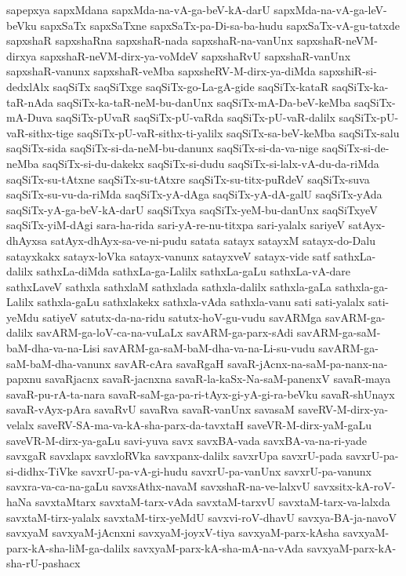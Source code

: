 {sapepxya
sapxMdana
sapxMda-na-vA-ga-beV-kA-darU
sapxMda-na-vA-ga-leV-beVku
sapxSaTx
sapxSaTxne
sapxSaTx-pa-Di-sa-ba-hudu
sapxSaTx-vA-gu-tatxde
sapxshaR
sapxshaRna
sapxshaR-nada
sapxshaR-na-vanUnx
sapxshaR-neVM-dirxya
sapxshaR-neVM-dirx-ya-voMdeV
sapxshaRvU
sapxshaR-vanUnx
sapxshaR-vanunx
sapxshaR-veMba
sapxsheRV-M-dirx-ya-diMda
sapxshiR-si-dedxlAlx
saqSiTx
saqSiTxge
saqSiTx-go-La-gA-gide
saqSiTx-kataR
saqSiTx-ka-taR-nAda
saqSiTx-ka-taR-neM-bu-danUnx
saqSiTx-mA-Da-beV-keMba
saqSiTx-mA-Duva
saqSiTx-pUvaR
saqSiTx-pU-vaRda
saqSiTx-pU-vaR-dalilx
saqSiTx-pU-vaR-sithx-tige
saqSiTx-pU-vaR-sithx-ti-yalilx
saqSiTx-sa-beV-keMba
saqSiTx-salu
saqSiTx-sida
saqSiTx-si-da-neM-bu-danunx
saqSiTx-si-da-va-nige
saqSiTx-si-de-neMba
saqSiTx-si-du-dakekx
saqSiTx-si-dudu
saqSiTx-si-lalx-vA-du-da-riMda
saqSiTx-su-tAtxne
saqSiTx-su-tAtxre
saqSiTx-su-titx-puRdeV
saqSiTx-suva
saqSiTx-su-vu-da-riMda
saqSiTx-yA-dAga
saqSiTx-yA-dA-galU
saqSiTx-yAda
saqSiTx-yA-ga-beV-kA-darU
saqSiTxya
saqSiTx-yeM-bu-danUnx
saqSiTxyeV
saqSiTx-yiM-dAgi
sara-ha-rida
sari-yA-re-nu-titxpa
sari-yalalx
sariyeV
satAyx-dhAyxsa
satAyx-dhAyx-sa-ve-ni-pudu
satata
satayx
satayxM
satayx-do-Dalu
satayxkakx
satayx-loVka
satayx-vanunx
satayxveV
satayx-vide
satf
sathxLa-dalilx
sathxLa-diMda
sathxLa-ga-Lalilx
sathxLa-gaLu
sathxLa-vA-dare
sathxLaveV
sathxla
sathxlaM
sathxlada
sathxla-dalilx
sathxla-gaLa
sathxla-ga-Lalilx
sathxla-gaLu
sathxlakekx
sathxla-vAda
sathxla-vanu
sati
sati-yalalx
sati-yeMdu
satiyeV
satutx-da-na-ridu
satutx-hoV-gu-vudu
savARMga
savARM-ga-dalilx
savARM-ga-loV-ca-na-vuLaLx
savARM-ga-parx-sAdi
savARM-ga-saM-baM-dha-va-na-Lisi
savARM-ga-saM-baM-dha-va-na-Li-su-vudu
savARM-ga-saM-baM-dha-vanunx
savAR-cAra
savaRgaH
savaR-jAcnx-na-saM-pa-nanx-na-papxnu
savaRjacnx
savaR-jacnxna
savaR-la-kaSx-Na-saM-panenxV
savaR-maya
savaR-pu-rA-ta-nara
savaR-saM-ga-pa-ri-tAyx-gi-yA-gi-ra-beVku
savaR-shUnayx
savaR-vAyx-pAra
savaRvU
savaRva
savaR-vanUnx
savasaM
saveRV-M-dirx-ya-velalx
saveRV-SA-ma-va-kA-sha-parx-da-tavxtaH
saveVR-M-dirx-yaM-gaLu
saveVR-M-dirx-ya-gaLu
savi-yuva
savx
savxBA-vada
savxBA-va-na-ri-yade
savxgaR
savxlapx
savxloRVka
savxpanx-dalilx
savxrUpa
savxrU-pada
savxrU-pa-si-didhx-TiVke
savxrU-pa-vA-gi-hudu
savxrU-pa-vanUnx
savxrU-pa-vanunx
savxra-va-ca-na-gaLu
savxsAthx-navaM
savxshaR-na-ve-lalxvU
savxsitx-kA-roV-haNa
savxtaMtarx
savxtaM-tarx-vAda
savxtaM-tarxvU
savxtaM-tarx-va-lalxda
savxtaM-tirx-yalalx
savxtaM-tirx-yeMdU
savxvi-roV-dhavU
savxya-BA-ja-navoV
savxyaM
savxyaM-jAcnxni
savxyaM-joyxV-tiya
savxyaM-parx-kAsha
savxyaM-parx-kA-sha-liM-ga-dalilx
savxyaM-parx-kA-sha-mA-na-vAda
savxyaM-parx-kA-sha-rU-pashacx
}
